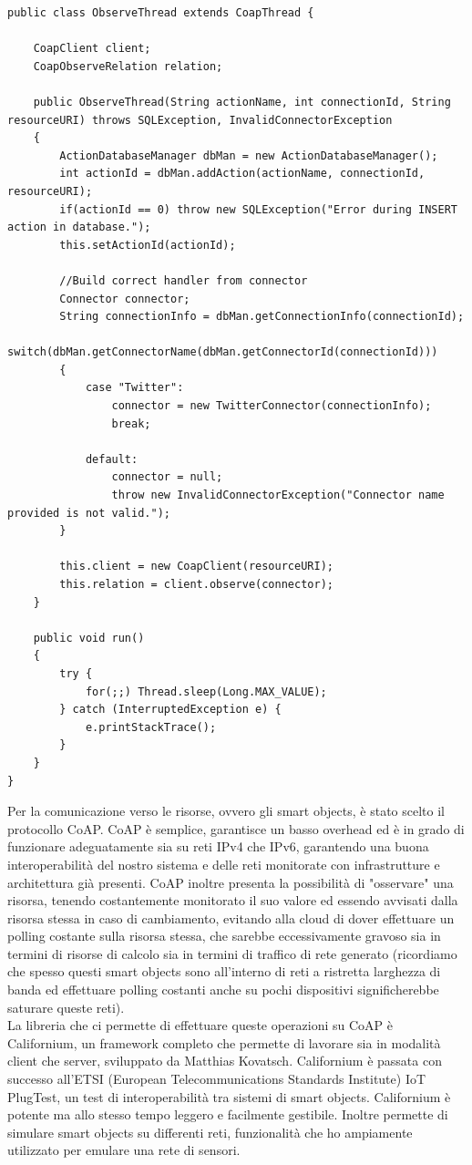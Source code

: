 \lstset{title=L'ObserveThread}
\begin{lstlisting}[float]
public class ObserveThread extends CoapThread {
	
	CoapClient client;
	CoapObserveRelation relation;
	
	public ObserveThread(String actionName, int connectionId, String resourceURI) throws SQLException, InvalidConnectorException
	{
		ActionDatabaseManager dbMan = new ActionDatabaseManager();
		int actionId = dbMan.addAction(actionName, connectionId, resourceURI);
		if(actionId == 0) throw new SQLException("Error during INSERT action in database.");
		this.setActionId(actionId);
		
		//Build correct handler from connector
		Connector connector;
		String connectionInfo = dbMan.getConnectionInfo(connectionId);
		switch(dbMan.getConnectorName(dbMan.getConnectorId(connectionId)))
		{
			case "Twitter":
				connector = new TwitterConnector(connectionInfo);
				break;
				
			default: 
				connector = null;
				throw new InvalidConnectorException("Connector name provided is not valid.");
		}
		
		this.client = new CoapClient(resourceURI);
		this.relation = client.observe(connector);
	}
	
	public void run()
	{
		try {
			for(;;) Thread.sleep(Long.MAX_VALUE);
		} catch (InterruptedException e) {
			e.printStackTrace();
		}
	}
}
\end{lstlisting}

Per la comunicazione verso le risorse, ovvero gli smart objects, è stato scelto il protocollo CoAP. CoAP è semplice, garantisce un basso overhead ed è in grado di funzionare adeguatamente sia su reti IPv4 che IPv6, garantendo una buona interoperabilità del nostro sistema e delle reti monitorate con infrastrutture e architettura già presenti. CoAP inoltre presenta la possibilità di "osservare" una risorsa, tenendo costantemente monitorato il suo valore ed essendo avvisati dalla risorsa stessa in caso di cambiamento, evitando alla cloud di dover effettuare un polling costante sulla risorsa stessa, che sarebbe eccessivamente gravoso sia in termini di risorse di calcolo sia in termini di traffico di rete generato (ricordiamo che spesso questi smart objects sono all'interno di reti a ristretta larghezza di banda ed effettuare polling costanti anche su pochi dispositivi significherebbe saturare queste reti).
\\La libreria che ci permette di effettuare queste operazioni su CoAP è Californium, un framework completo che permette di lavorare sia in modalità client che server, sviluppato da Matthias Kovatsch. Californium è passata con successo all'ETSI (European Telecommunications Standards Institute) IoT PlugTest, un test di interoperabilità tra sistemi di smart objects. Californium è potente ma allo stesso tempo leggero e facilmente gestibile. Inoltre permette di simulare smart objects su differenti reti, funzionalità che ho ampiamente utilizzato per emulare una rete di sensori.


